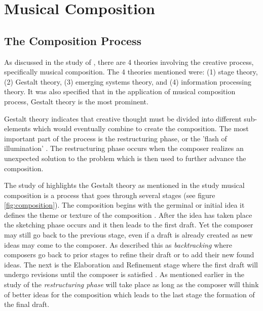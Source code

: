 \section{Musical Composition}
\subsection{The Composition Process}
As discussed in the study of , there are 4 theories involving the creative process, specifically musical composition. The 4 theories mentioned were: (1) stage theory, (2) Gestalt theory, (3) emerging systems theory, and (4) information processing theory. It was also specified that in the application of musical composition process, Gestalt theory is the most prominent. 

Gestalt theory indicates that creative thought must be divided into different sub-elements which would eventually combine to create the composition. The most important part of the process is the restructuring phase, or the 'flash of illumination' \cite{collins2005synthesis}. The restructuring phase occurs when the composer realizes an unexpected solution to the problem which is then used to further advance the composition.

The study of  highlights the Gestalt theory as mentioned in the study musical composition is a process that goes through several stages (see figure \ref{fig:composition}). The composition begins with the germinal  or initial idea it defines the theme or texture of the composition \cite{bennett1976process,collins2005synthesis}. After the idea has taken place the sketching phase occurs and it then leads to the first draft. Yet the composer may still go back to the previous stage, even if a draft is already created as new ideas may come to the composer. As  described this as \textit{backtracking} where composers go back to prior stages to refine their draft or to add their new found ideas. The next is the Elaboration and Refinement stage where the first draft will undergo revisions until the composer is satisfied \cite{bennett1976process}. As mentioned earlier in the study of   the \textit{restructuring phase} will take place as long as the composer will think of better ideas for the composition which leads to the last stage the formation of the final draft.  

